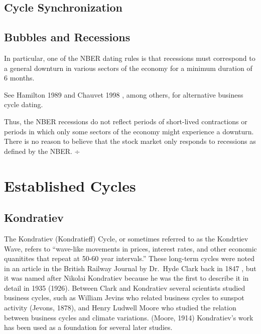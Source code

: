 \documentclass[]{book}
\begin{document}
\hypertarget{cycle-synchronization}{%
\subsection{Cycle Synchronization}\label{cycle-synchronization}}

\citep{crum1925progressive}
\citep{harding2006synchronization}

\hypertarget{bubbles-and-recessions}{%
\subsection{Bubbles and Recessions}\label{bubbles-and-recessions}}

\citep{mcqueen1994bubbles}

In particular, one of the NBER dating rules is that recessions must correspond to a general downturn in various sectors of the economy for a minimum duration of 6 months.

See Hamilton 1989 and Chauvet 1998 , among others, for alternative business cycle dating.

Thus, the NBER recessions do not reflect periods of short-lived contractions or periods in which only some sectors of the economy might experience a downturn. There is no reason to believe that the stock market only responds to recessions as defined by the NBER. ÷

\citep{chauvet2000coincident}

\hypertarget{established-cycles}{%
\section{Established Cycles}\label{established-cycles}}

\hypertarget{kondratiev}{%
\subsection{Kondratiev}\label{kondratiev}}

The Kondratiev (Kondratieff) Cycle, or sometimes referred to as the Kondrtiev Wave, refers to ``wave-like movements in prices, interest rates, and other economic quanitites that repeat at 50-60 year intervals.'' \citep{alexander2002kondratiev} These long-term cycles were noted in an article in the British Railway Journal by Dr.~Hyde Clark back in 1847 \citep{mager1987kondratiev}, but it was named after Nikolai Kondratiev because he was the first to describe it in detail in 1935 (1926). Between Clark and Kondratiev several scientists studied business cycles, such as William Jevins who related business cycles to sunspot activity (Jevons, 1878), and Henry Ludwell Moore who studied the relation between business cycles and climate variations. (Moore, 1914) Kondratiev's work has been used as a foundation for several later studies.
\end{document}
